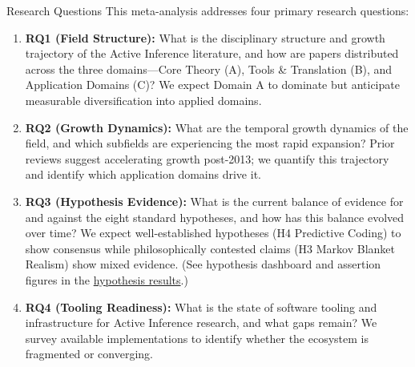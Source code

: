 \documentclass[
  ignorenonframetext,
]{beamer}
\providecommand{\tightlist}{%
  \setlength{\itemsep}{0pt}\setlength{\parskip}{0pt}}
\begin{document}
\begin{frame}[allowframebreaks]{Research Questions}
\protect{}\label{research-questions}
This meta-analysis addresses four primary research questions:

\begin{enumerate}
\tightlist
\item
  \textbf{RQ1 (Field Structure):} What is the disciplinary structure and
  growth trajectory of the Active Inference literature, and how are
  papers distributed across the three domains---Core Theory (A), Tools
  \& Translation (B), and Application Domains (C)? We expect Domain A to
  dominate but anticipate measurable diversification into applied
  domains.
\item
  \textbf{RQ2 (Growth Dynamics):} What are the temporal growth dynamics
  of the field, and which subfields are experiencing the most rapid
  expansion? Prior reviews suggest accelerating growth post-2013; we
  quantify this trajectory and identify which application domains drive
  it.
\item
  \textbf{RQ3 (Hypothesis Evidence):} What is the current balance of
  evidence for and against the eight standard hypotheses, and how has
  this balance evolved over time? We expect well-established hypotheses
  (H4 Predictive Coding) to show consensus while philosophically
  contested claims (H3 Markov Blanket Realism) show mixed evidence. (See
  hypothesis dashboard and assertion figures in the
  \hyperref[sec:hypothesis_results]{hypothesis results}.)
\item
  \textbf{RQ4 (Tooling Readiness):} What is the state of software
  tooling and infrastructure for Active Inference research, and what
  gaps remain? We survey available implementations to identify whether
  the ecosystem is fragmented or converging.
\end{enumerate}
\end{frame}
\end{document}
